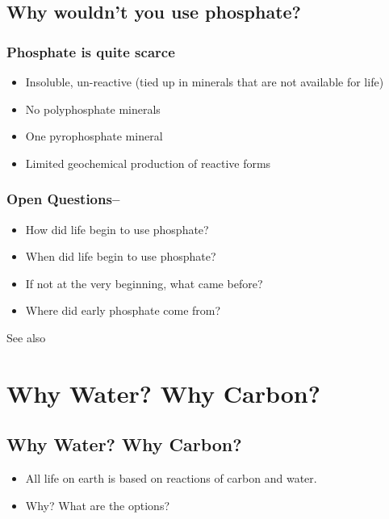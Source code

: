 \documentclass[]{article}
\begin{document}
\subsection{Why wouldn't you use phosphate?}

\subsubsection{Phosphate is quite scarce\cite{keefe1995polyphosphates}}
\begin{itemize}
	\item Insoluble, un-reactive (tied up in minerals that are not available for life)
	\item No polyphosphate minerals
	\item One pyrophosphate mineral
	\item Limited geochemical production of reactive forms
\end{itemize}
\subsubsection{Open Questions--\cite{life2017special}}

\begin{itemize}
	\item How did life begin to use phosphate?
	\item When did life begin to use phosphate?
	\item If not at the very beginning, what came before?\cite{goldford2017remnants}
	\item Where did early phosphate come from?
\end{itemize}

See also \cite{westheimer1987nature,soderberg2019organic}

\section{Why Water? Why Carbon?}

\subsection{Why Water? Why Carbon?}

\begin{itemize}
	\item All life on earth is based on reactions of carbon and water.
	\item Why? What are the options?
\end{itemize}
\end{document}
